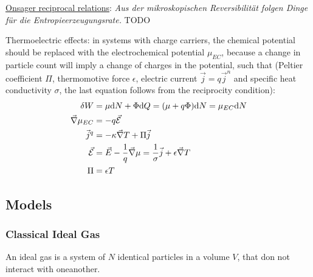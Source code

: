 			\noindent
			\href{https://en.wikipedia.org/wiki/Onsager_reciprocal_relations}{Onsager reciprocal relations}:
			\newline\indent\emph{Aus der mikroskopischen Reversibilität folgen Dinge für die Entropieerzeugungsrate.} TODO\vsp

			\noindent
			Thermoelectric effects: in systems with charge carriers, the chemical potential should be replaced with the electrochemical potential $\mu_{EC}$, because a change in particle count will imply a change of charges in the potential, such that (Peltier coefficient $\Pi$, thermomotive force $\epsilon$, electric current $\vec{j} = q\vec{j}^n$ and specific heat conductivity $\sigma$, the last equation follows from the reciprocity condition):
			\begin{equation}
				\begin{aligned}
					\delta W &= \mu \mathrm{d} N + \Phi \mathrm{d} Q = (\mu+q\Phi)\mathrm{d} N = \mu_{EC} \mathrm{d} N \\
					\vec{\nabla} \mu_{EC} &= -q\vec{\mathcal{E}} \\
					\vec{j}^q &= - \kappa \vec{\nabla} T + \Pi \vec{j} \\
					\vec{\mathcal{E}} &= \vec{E} - \frac{1}{q} \vec{\nabla} \mu = \frac{1}{\sigma} \vec{j} + \epsilon \vec{\nabla} T \\
					\Pi &= \epsilon T \\
				\end{aligned}
			\end{equation}


	\subsection{Models}
		\subsubsection{Classical Ideal Gas}
			\noindent
			An ideal gas is a system of $N$ identical particles in a volume $V$, that don not interact with oneanother.\vsp


